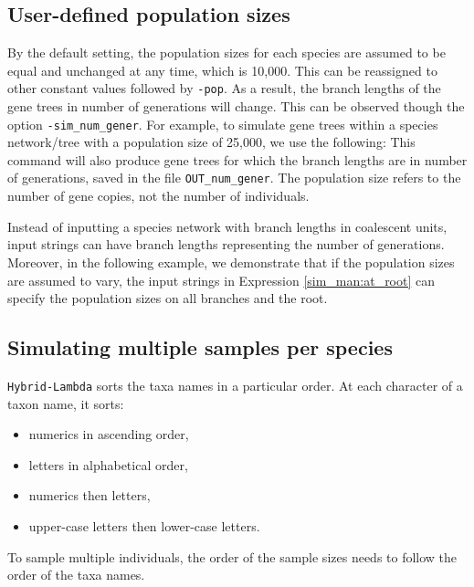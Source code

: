 \subsection{User-defined population sizes}\label{sim_man:pop}
By the default setting, the population sizes for each species are assumed to be equal and unchanged at any time, which is 10,000. This can be reassigned to other constant values followed by {\tt -pop}. As a result, the branch lengths of the gene trees in number of generations will change. This can be observed though the option {\tt -sim\_num\_gener}. For example, to simulate gene trees within a species network/tree with a population size of 25,000,
we use the following:
This command will also produce gene trees for which the branch lengths are in number of generations, saved in the file {\tt OUT\_num\_gener}.
\newline{} The population size refers to the number of gene copies, not the number of individuals.

Instead of inputting a species network with branch lengths in coalescent units, input strings can have branch lengths representing the number of generations.
Moreover, in the following example, we demonstrate that if the population sizes are assumed to vary, the input strings in Expression \eqref{sim_man:at_root} can specify the population sizes on all branches and the root.

\subsection{Simulating multiple samples per species}
{\tt Hybrid-Lambda} sorts the taxa names in a particular order. At each character of a taxon name, it sorts:
\begin{itemize}
\item numerics in ascending order,
\item letters in alphabetical order,
\item numerics then letters,
\item upper-case letters then lower-case letters.
\end{itemize}
To sample multiple individuals, the order of the sample sizes needs to follow the order of the taxa names.


